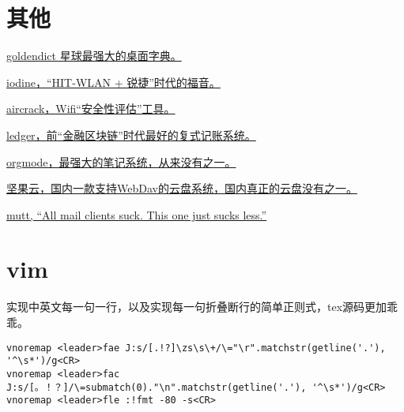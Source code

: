 \section{其他}

\href{https://github.com/goldendict/goldendict}{goldendict 星球最强大的桌面字典。}

\href{https://github.com/yarrick/iodine}{iodine，“HIT-WLAN + 锐捷”时代的福音。}

\href{http://www.aircrack-ng.org/}{aircrack，Wifi“安全性评估”工具。}

\href{https://www.ledger-cli.org/}{ledger，前“金融区块链”时代最好的复式记账系统。}

\href{https://orgmode.org/}{orgmode，最强大的笔记系统，从来没有之一。}

\href{https://www.jianguoyun.com/}{坚果云，国内一款支持WebDav的云盘系统，国内真正的云盘没有之一。}

\href{http://www.mutt.org/}{mutt, ``All mail clients suck. This one just sucks less.''}

\section{vim}
实现中英文每一句一行，以及实现每一句折叠断行的简单正则式，tex源码更加乖乖。
\begin{lstlisting}
vnoremap <leader>fae J:s/[.!?]\zs\s\+/\="\r".matchstr(getline('.'), '^\s*')/g<CR>
vnoremap <leader>fac J:s/[。！？]/\=submatch(0)."\n".matchstr(getline('.'), '^\s*')/g<CR>
vnoremap <leader>fle :!fmt -80 -s<CR>
\end{lstlisting}
